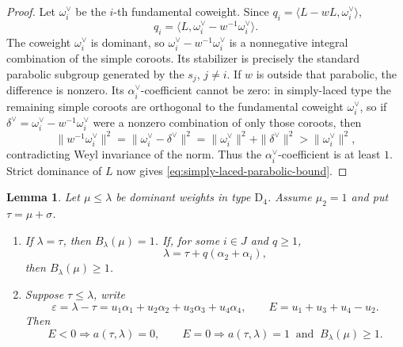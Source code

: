 \documentclass[11pt]{article}
\newtheorem{lemma}[lemma]{Lemma}
\theoremstyle{definition}
\theoremstyle{remark}
\newcommand{\typeD}{\ensuremath{\mathrm{D}}}
\begin{document}
\begin{proof}
Let $\omega_i^\vee$ be the $i$-th fundamental coweight.  Since
$q_i=\langle L-wL,\omega_i^\vee\rangle$,
\[
 q_i=\langle L,\omega_i^\vee-w^{-1}\omega_i^\vee\rangle.
\]
The coweight $\omega_i^\vee$ is dominant, so
$\omega_i^\vee-w^{-1}\omega_i^\vee$ is a nonnegative integral combination
of the simple coroots.  Its stabilizer is precisely the standard parabolic
subgroup generated by the $s_j$, $j\ne i$.  If $w$ is outside that
parabolic, the difference is nonzero.  Its $\alpha_i^\vee$-coefficient cannot be zero: in simply-laced type the
remaining simple coroots are orthogonal to the fundamental coweight
$\omega_i^\vee$, so if
$\delta^\vee=\omega_i^\vee-w^{-1}\omega_i^\vee$ were a nonzero combination of
only those coroots, then
\[
 \|w^{-1}\omega_i^\vee\|^2
   =\|\omega_i^\vee-\delta^\vee\|^2
   =\|\omega_i^\vee\|^2+\|\delta^\vee\|^2
   >\|\omega_i^\vee\|^2,
\]
contradicting Weyl invariance of the norm.  Thus the
$\alpha_i^\vee$-coefficient is at least $1$.  Strict dominance of $L$ now
gives \eqref{eq:simply-laced-parabolic-bound}.
\end{proof}

\begin{lemma}\label{lem:D4-boundary-estimates}
Let $\mu\le\lambda$ be dominant weights in type $\typeD_4$.
Assume $\mu_2=1$ and put $\tau=\mu+\sigma$.
\begin{enumerate}[label=\textnormal{(\alph*)}]
\item If $\lambda=\tau$, then $B_\lambda(\mu)=1$.  If, for some
$i\in J$ and $q\ge1$,
\[
       \lambda=\tau+q(\alpha_2+\alpha_i),
\]
then $B_\lambda(\mu)\ge1$.
\item Suppose $\tau\le\lambda$, write
\[
 \varepsilon=\lambda-\tau
   =u_1\alpha_1+u_2\alpha_2+u_3\alpha_3+u_4\alpha_4,
 \qquad
 E=u_1+u_3+u_4-u_2.
\]
Then
\[
 E<0\Longrightarrow a(\tau,\lambda)=0,
 \qquad
 E=0\Longrightarrow a(\tau,\lambda)=1\ \text{ and }\ B_\lambda(\mu)\ge1.
\]
\end{enumerate}
\end{lemma}
\end{document}
